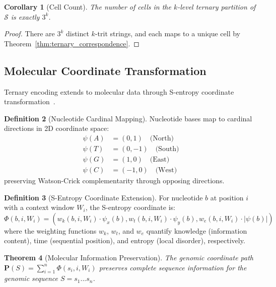 \documentclass[11pt,twocolumn,a4paper]{article}
\newtheorem{theorem}{Theorem}[section]
\newtheorem{corollary}[theorem]{Corollary}
\theoremstyle{definition}
\newtheorem{definition}[theorem]{Definition}
\theoremstyle{remark}
\newcommand{\Sspace}{\mathcal{S}}
\begin{document}
\begin{corollary}[Cell Count]
\label{cor:cell_count}
The number of cells in the $k$-level ternary partition of $\Sspace$ is exactly $3^k$.
\end{corollary}

\begin{proof}
There are $3^k$ distinct $k$-trit strings, and each maps to a unique cell by Theorem~\ref{thm:ternary_correspondence}.
\end{proof}

\subsection{Molecular Coordinate Transformation}

Ternary encoding extends to molecular data through S-entropy coordinate transformation~\cite{weininger1988smiles,cover2006elements,shannon1948mathematical}.

\begin{definition}[Nucleotide Cardinal Mapping]
\label{def:nucleotide_cardinal}
Nucleotide bases map to cardinal directions in 2D coordinate space:
\begin{align}
\psi(A) &= (0, 1) \quad \text{(North)} \\
\psi(T) &= (0, -1) \quad \text{(South)} \\
\psi(G) &= (1, 0) \quad \text{(East)} \\
\psi(C) &= (-1, 0) \quad \text{(West)}
\end{align}
preserving Watson-Crick complementarity through opposing directions.
\end{definition}

\begin{definition}[S-Entropy Coordinate Extension]
\label{def:sentropy_extension}
For nucleotide $b$ at position $i$ with a context window $W_i$, the S-entropy coordinate is:
\begin{equation}
\Phi(b,i,W_i) = (w_k(b,i,W_i) \cdot \psi_x(b), w_t(b,i,W_i) \cdot \psi_y(b), w_e(b,i,W_i) \cdot |\psi(b)|)
\end{equation}
where the weighting functions $w_k$, $w_t$, and $w_e$ quantify knowledge (information content), time (sequential position), and entropy (local disorder), respectively.
\end{definition}

\begin{theorem}[Molecular Information Preservation]
\label{thm:molecular_preservation}
The genomic coordinate path $\mathbf{P}(S) = \sum_{i=1}^n \Phi(s_i, i, W_i)$ preserves complete sequence information for the genomic sequence $S = s_1...s_n$.
\end{theorem}
\end{document}
